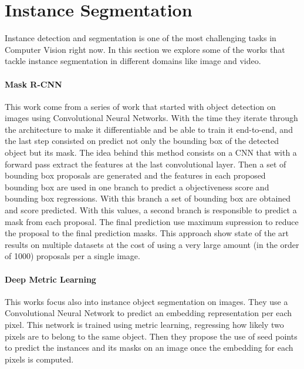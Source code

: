 


\section{Instance Segmentation}

Instance detection and segmentation is one of the most challenging tasks in Computer Vision right now.
In this section we explore some of the works that tackle instance segmentation in different domains like image and video.

\paragraph{Mask R-CNN~\cite{he2017mask}}
This work come from a series of work that started with object detection on images using Convolutional Neural Networks.
With the time they iterate through the architecture to make it differentiable and be able to train it end-to-end, and the last step consisted on predict not only the bounding box of the detected object but its mask.
The idea behind this method consists on a CNN that with a forward pass extract the features at the last convolutional layer.
Then a set of bounding box proposals are generated and the features in each proposed bounding box are used in one branch to predict a objectiveness score and bounding box regressions.
With this branch a set of bounding box are obtained and score predicted. With this values, a second branch is responsible to predict a mask from each proposal.
The final prediction use maximum supression to reduce the proposal to the final prediction masks.
This approach show state of the art results on multiple datasets at the cost of using a very large amount (in the order of 1000) proposals per a single image.

\paragraph{Deep Metric Learning~\cite{fathi2017semantic}}
This works focus also into instance object segmentation on images.
They use a Convolutional Neural Network to predict an embedding representation per each pixel.
This network is trained using metric learning, regressing how likely two pixels are to belong to the same object.
Then they propose the use of seed points to predict the instances and its masks on an image once the embedding for each pixels is computed.

